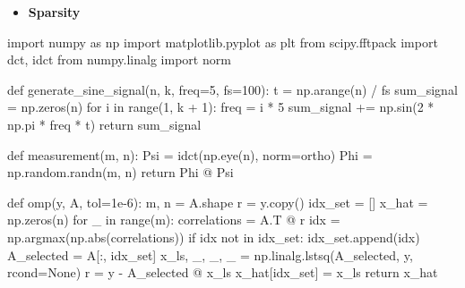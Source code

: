 \documentclass[
  letterpaper,
  DIV=11,
  numbers=noendperiod]{scrartcl}
\newenvironment{Shaded}{\begin{snugshade}}{\end{snugshade}}
\newcommand{\BuiltInTok}[1]{\textcolor[rgb]{0.40,0.85,0.94}{#1}}
\newcommand{\ControlFlowTok}[1]{\textcolor[rgb]{0.98,0.15,0.45}{#1}}
\newcommand{\DecValTok}[1]{\textcolor[rgb]{0.68,0.51,1.00}{#1}}
\newcommand{\FloatTok}[1]{\textcolor[rgb]{0.68,0.51,1.00}{#1}}
\newcommand{\ImportTok}[1]{\textcolor[rgb]{0.98,0.15,0.45}{#1}}
\newcommand{\KeywordTok}[1]{\textcolor[rgb]{0.98,0.15,0.45}{#1}}
\newcommand{\NormalTok}[1]{\textcolor[rgb]{0.97,0.97,0.95}{#1}}
\newcommand{\OperatorTok}[1]{\textcolor[rgb]{0.97,0.97,0.95}{#1}}
\newcommand{\StringTok}[1]{\textcolor[rgb]{0.90,0.86,0.45}{#1}}
\newcommand{\VariableTok}[1]{\textcolor[rgb]{0.97,0.97,0.95}{#1}}
\providecommand{\tightlist}{%
  \setlength{\itemsep}{0pt}\setlength{\parskip}{0pt}}
\begin{document}
\begin{itemize}
\tightlist
\item
  \textbf{Sparsity}
\end{itemize}

\begin{Shaded}
\begin{Highlighting}[]
\ImportTok{import}\NormalTok{ numpy }\ImportTok{as}\NormalTok{ np}
\ImportTok{import}\NormalTok{ matplotlib.pyplot }\ImportTok{as}\NormalTok{ plt}
\ImportTok{from}\NormalTok{ scipy.fftpack }\ImportTok{import}\NormalTok{ dct, idct}
\ImportTok{from}\NormalTok{ numpy.linalg }\ImportTok{import}\NormalTok{ norm}

\KeywordTok{def}\NormalTok{ generate\_sine\_signal(n, k, freq}\OperatorTok{=}\DecValTok{5}\NormalTok{, fs}\OperatorTok{=}\DecValTok{100}\NormalTok{):}
\NormalTok{    t }\OperatorTok{=}\NormalTok{ np.arange(n) }\OperatorTok{/}\NormalTok{ fs}
\NormalTok{    sum\_signal }\OperatorTok{=}\NormalTok{ np.zeros(n)}
    \ControlFlowTok{for}\NormalTok{ i }\KeywordTok{in} \BuiltInTok{range}\NormalTok{(}\DecValTok{1}\NormalTok{, k }\OperatorTok{+} \DecValTok{1}\NormalTok{):}
\NormalTok{        freq }\OperatorTok{=}\NormalTok{ i }\OperatorTok{*} \DecValTok{5}
\NormalTok{        sum\_signal }\OperatorTok{+=}\NormalTok{ np.sin(}\DecValTok{2} \OperatorTok{*}\NormalTok{ np.pi }\OperatorTok{*}\NormalTok{ freq }\OperatorTok{*}\NormalTok{ t)}
    \ControlFlowTok{return}\NormalTok{ sum\_signal}

\KeywordTok{def}\NormalTok{ measurement(m, n):}
\NormalTok{    Psi }\OperatorTok{=}\NormalTok{ idct(np.eye(n), norm}\OperatorTok{=}\StringTok{\textquotesingle{}ortho\textquotesingle{}}\NormalTok{)}
\NormalTok{    Phi }\OperatorTok{=}\NormalTok{ np.random.randn(m, n)}
    \ControlFlowTok{return}\NormalTok{ Phi }\OperatorTok{@}\NormalTok{ Psi}

\KeywordTok{def}\NormalTok{ omp(y, A, tol}\OperatorTok{=}\FloatTok{1e{-}6}\NormalTok{):}
\NormalTok{    m, n }\OperatorTok{=}\NormalTok{ A.shape}
\NormalTok{    r }\OperatorTok{=}\NormalTok{ y.copy()}
\NormalTok{    idx\_set }\OperatorTok{=}\NormalTok{ []}
\NormalTok{    x\_hat }\OperatorTok{=}\NormalTok{ np.zeros(n)}
    \ControlFlowTok{for}\NormalTok{ \_ }\KeywordTok{in} \BuiltInTok{range}\NormalTok{(m):}
\NormalTok{        correlations }\OperatorTok{=}\NormalTok{ A.T }\OperatorTok{@}\NormalTok{ r}
\NormalTok{        idx }\OperatorTok{=}\NormalTok{ np.argmax(np.}\BuiltInTok{abs}\NormalTok{(correlations))}
        \ControlFlowTok{if}\NormalTok{ idx }\KeywordTok{not} \KeywordTok{in}\NormalTok{ idx\_set:}
\NormalTok{            idx\_set.append(idx)}
\NormalTok{        A\_selected }\OperatorTok{=}\NormalTok{ A[:, idx\_set]}
\NormalTok{        x\_ls, \_, \_, \_ }\OperatorTok{=}\NormalTok{ np.linalg.lstsq(A\_selected, y, rcond}\OperatorTok{=}\VariableTok{None}\NormalTok{)}
\NormalTok{        r }\OperatorTok{=}\NormalTok{ y }\OperatorTok{{-}}\NormalTok{ A\_selected }\OperatorTok{@}\NormalTok{ x\_ls}
\NormalTok{    x\_hat[idx\_set] }\OperatorTok{=}\NormalTok{ x\_ls}
    \ControlFlowTok{return}\NormalTok{ x\_hat}


\end{Highlighting}
\end{Shaded}
\end{document}
